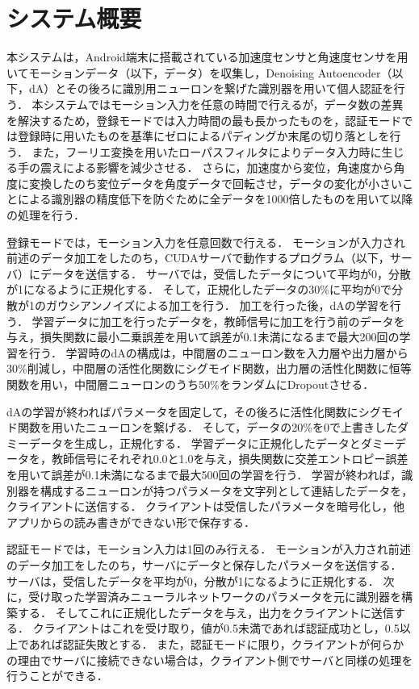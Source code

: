 \section{システム概要}
本システムは，Android端末に搭載されている加速度センサと角速度センサを用いてモーションデータ（以下，データ）を収集し，Denoising Autoencoder（以下，dA）とその後ろに識別用ニューロンを繋げた識別器を用いて個人認証を行う．
本システムではモーション入力を任意の時間で行えるが，データ数の差異を解決するため，登録モードでは入力時間の最も長かったものを，認証モードでは登録時に用いたものを基準にゼロによるパディングか末尾の切り落としを行う．
また，フーリエ変換を用いたローパスフィルタによりデータ入力時に生じる手の震えによる影響を減少させる．
さらに，加速度から変位，角速度から角度に変換したのち変位データを角度データで回転させ，データの変化が小さいことによる識別器の精度低下を防ぐために全データを1000倍したものを用いて以降の処理を行う．

登録モードでは，モーション入力を任意回数で行える．
モーションが入力され前述のデータ加工をしたのち，CUDAサーバで動作するプログラム（以下，サーバ）にデータを送信する．
サーバでは，受信したデータについて平均が0，分散が1になるように正規化する．
そして，正規化したデータの30\%に平均が0で分散が1のガウシアンノイズによる加工を行う．
加工を行った後，dAの学習を行う．
学習データに加工を行ったデータを，教師信号に加工を行う前のデータを与え，損失関数に最小二乗誤差を用いて誤差が0.1未満になるまで最大200回の学習を行う．
学習時のdAの構成は，中間層のニューロン数を入力層や出力層から30\%削減し，中間層の活性化関数にシグモイド関数，出力層の活性化関数に恒等関数を用い，中間層ニューロンのうち50\%をランダムにDropoutさせる．

dAの学習が終わればパラメータを固定して，その後ろに活性化関数にシグモイド関数を用いたニューロンを繋げる．
そして，データの20\%を0で上書きしたダミーデータを生成し，正規化する．
学習データに正規化したデータとダミーデータを，教師信号にそれぞれ0.0と1.0を与え，損失関数に交差エントロピー誤差を用いて誤差が0.1未満になるまで最大500回の学習を行う．
学習が終われば，識別器を構成するニューロンが持つパラメータを文字列として連結したデータを，クライアントに送信する．
クライアントは受信したパラメータを暗号化し，他アプリからの読み書きができない形で保存する．

認証モードでは，モーション入力は1回のみ行える．
モーションが入力され前述のデータ加工をしたのち，サーバにデータと保存したパラメータを送信する．
サーバは，受信したデータを平均が0，分散が1になるように正規化する．
次に，受け取った学習済みニューラルネットワークのパラメータを元に識別器を構築する．
そしてこれに正規化したデータを与え，出力をクライアントに送信する．
クライアントはこれを受け取り，値が0.5未満であれば認証成功とし，0.5以上であれば認証失敗とする．
また，認証モードに限り，クライアントが何らかの理由でサーバに接続できない場合は，クライアント側でサーバと同様の処理を行うことができる．
